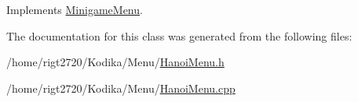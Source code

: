 Implements \hyperlink{classMinigameMenu_abde3ae319bf1660a8626c6f765e054a8}{Minigame\-Menu}.



The documentation for this class was generated from the following files\-:\begin{DoxyCompactItemize}
\item 
/home/rigt2720/\-Kodika/\-Menu/\hyperlink{HanoiMenu_8h}{Hanoi\-Menu.\-h}\item 
/home/rigt2720/\-Kodika/\-Menu/\hyperlink{HanoiMenu_8cpp}{Hanoi\-Menu.\-cpp}\end{DoxyCompactItemize}
